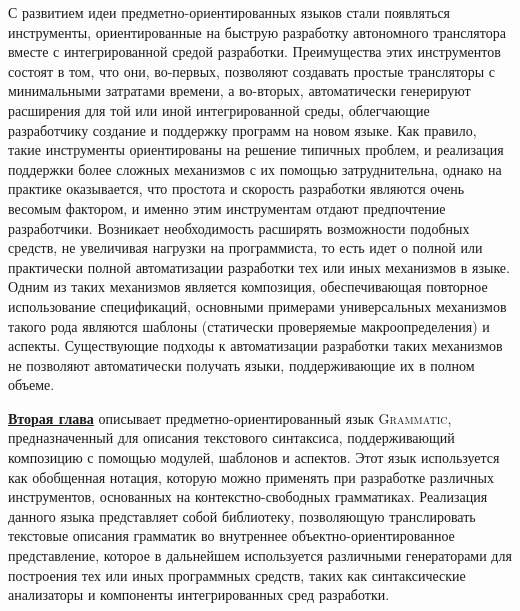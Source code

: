\documentclass[12pt,a4paper]{article}
\newcommand{\tool}[1]{\textsc{#1}}
\theoremstyle{definition}
\theoremstyle{plain}
\newcommand{\GRM}{\tool{Grammatic}}
\newcommand{\afsubsection}[1]{\par \underline{\textbf{#1}}}
\begin{document}
С развитием идеи предметно-ориентированных языков стали появляться инструменты, ориентированные на быструю разработку автономного транслятора вместе с интегрированной средой разработки. Преимущества этих инструментов состоят в том, что они, во-первых, позволяют создавать простые трансляторы с минимальными затратами времени, а во-вторых, автоматически генерируют расширения для той или иной интегрированной среды, облегчающие разработчику создание и поддержку программ на новом языке. Как правило, такие инструменты ориентированы на решение типичных проблем, и реализация поддержки более сложных механизмов с их помощью затруднительна, однако на практике оказывается, что простота и скорость разработки являются очень весомым фактором, и именно этим инструментам отдают предпочтение разработчики. Возникает необходимость расширять возможности подобных средств, не увеличивая нагрузки на программиста, то есть идет о полной или практически полной автоматизации разработки тех или иных механизмов в языке. Одним из таких механизмов является композиция, обеспечивающая повторное использование спецификаций, основными примерами универсальных механизмов такого рода являются шаблоны (статически проверяемые макроопределения) и аспекты. Существующие подходы к автоматизации разработки таких механизмов не позволяют автоматически получать языки, поддерживающие их в полном объеме.

\afsubsection{Вторая глава} описывает предметно-ориентированный язык \GRM{}, предназначенный для описания текстового синтаксиса, поддерживающий композицию с помощью модулей, шаблонов и аспектов. Этот язык используется как обобщенная 
нотация, которую можно применять при разработке различных инструментов, основанных на контекстно-свободных грамматиках. Реализация данного языка представляет собой библиотеку, позволяющую транслировать текстовые описания грамматик во внутреннее объектно-ориентированное представление, которое в дальнейшем используется различными генераторами для построения тех или иных программных средств, таких как синтаксические анализаторы и компоненты интегрированных сред разработки.
\end{document}
